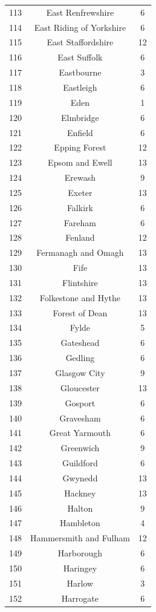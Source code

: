 \documentclass[Royal,times,sageh]{sagej}
\begin{document}
\begin{table}[!htbp]
\begin{tabular}{@{\extracolsep{5pt}} ccc}
113 & East Renfrewshire & 6 \\ 
114 & East Riding of Yorkshire & 6 \\ 
115 & East Staffordshire & 12 \\ 
116 & East Suffolk & 6 \\ 
117 & Eastbourne & 3 \\ 
118 & Eastleigh & 6 \\ 
119 & Eden & 1 \\ 
120 & Elmbridge & 6 \\ 
121 & Enfield & 6 \\ 
122 & Epping Forest & 12 \\ 
123 & Epsom and Ewell & 13 \\ 
124 & Erewash & 9 \\ 
125 & Exeter & 13 \\ 
126 & Falkirk & 6 \\ 
127 & Fareham & 6 \\ 
128 & Fenland & 12 \\ 
129 & Fermanagh and Omagh & 13 \\ 
130 & Fife & 13 \\ 
131 & Flintshire & 13 \\ 
132 & Folkestone and Hythe & 13 \\ 
133 & Forest of Dean & 13 \\ 
134 & Fylde & 5 \\ 
135 & Gateshead & 6 \\ 
136 & Gedling & 6 \\ 
137 & Glasgow City & 9 \\ 
138 & Gloucester & 13 \\ 
139 & Gosport & 6 \\ 
140 & Gravesham & 6 \\ 
141 & Great Yarmouth & 6 \\ 
142 & Greenwich & 9 \\ 
143 & Guildford & 6 \\ 
144 & Gwynedd & 13 \\ 
145 & Hackney & 13 \\ 
146 & Halton & 9 \\ 
147 & Hambleton & 4 \\ 
148 & Hammersmith and Fulham & 12 \\ 
149 & Harborough & 6 \\ 
150 & Haringey & 6 \\ 
151 & Harlow & 3 \\ 
152 & Harrogate & 6 \\ 

\end{tabular}
\end{table}
\end{document}
